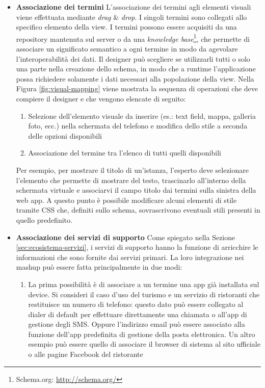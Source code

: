 \begin{itemize}
	\item \textbf{Associazione dei termini} 
	L'associazione dei termini agli elementi visuali viene effettuata mediante \emph{drag} \& \emph{drop}. I singoli termini sono collegati allo specifico elemento della view. 
	I termini possono essere acquisiti da una repository mantenuta sul server o da una \emph{knowledge base}\footnote{Schema.org: \url{http://schema.org/}}, che permette di associare un significato semantico a ogni termine in modo da agevolare l'interoperabilità dei dati. Il designer può scegliere se utilizzarli tutti o solo una parte nella creazione dello schema, in modo che a runtime l'applicazione possa richiedere solamente i dati necessari alla popolazione della view.
	Nella Figura \ref{fig:visual-mapping} viene mostrata la sequenza di operazioni che deve compiere il designer e che vengono elencate di seguito:
	\begin{enumerate}
		\item Selezione dell'elemento visuale da inserire (es.: text field, mappa, galleria foto, ecc.) nella schermata del telefono e modifica dello stile a seconda delle opzioni disponibili
		\item Associazione del termine tra l'elenco di tutti quelli disponibili
	\end{enumerate}
	Per esempio, per mostrare il titolo di un'istanza, l'esperto deve selezionare l'elemento che permette di mostrare del testo, trascinarlo all'interno della schermata virtuale e associarvi il campo titolo dai termini sulla sinistra della web app. A questo punto è possibile modificare alcuni elementi di stile tramite CSS che, definiti sullo schema, sovrascrivono eventuali stili presenti in quello predefinito.
	\item \textbf{Associazione dei servizi di supporto}
	Come spiegato nella Sezione \ref{sec:ecosistema-servizi}, i servizi di supporto hanno la funzione di arricchire le informazioni che sono fornite dai servizi primari. La loro integrazione nei mashup può essere fatta principalmente in due modi:
	\begin{enumerate}
	\item La prima possibilità è di associare a un termine una app già installata sul device. Si consideri il caso d'uso del turismo e un servizio di ristoranti che restituisce un numero di telefono: questo dato può essere collegato al dialer di default per effettuare direttamente una chiamata o all'app di gestione degli SMS. Oppure l'indirizzo email può essere associato alla funzione  dell'app predefinita di gestione della posta elettronica. Un altro esempio può essere quello di associare il browser di sistema al sito ufficiale o alle pagine Facebook del ristorante

\end{enumerate}
\end{itemize}
